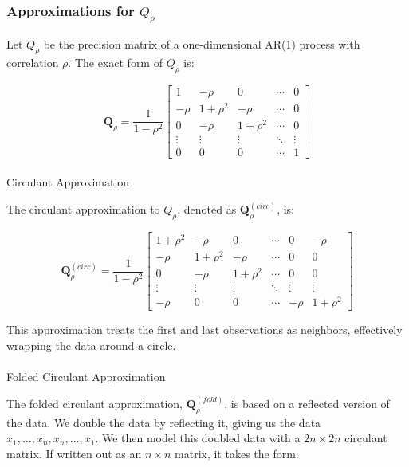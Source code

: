 \documentclass[
  letterpaper,
  DIV=11,
  numbers=noendperiod]{scrartcl}
\makeatletter
\let\oldparagraph\paragraph
\renewcommand{\paragraph}{
    \@ifstar
      \xxxParagraphStar
      \xxxParagraphNoStar
  }
\newcommand{\xxxParagraphStar}[1]{\oldparagraph*{#1}\mbox{}}
\newcommand{\xxxParagraphNoStar}[1]{\oldparagraph{#1}\mbox{}}
\makeatother
\begin{document}
\subsubsection{\texorpdfstring{Approximations for
\(Q_{\rho}\)}{Approximations for Q\_\{\textbackslash rho\}}}\label{approximations-for-q_rho}

Let \(Q_{\rho}\) be the precision matrix of a one-dimensional AR(1)
process with correlation \(\rho\). The exact form of \(Q_{\rho}\) is:

\[
\mathbf{Q}_\rho = \frac{1}{1-\rho^2}
\begin{bmatrix}
1 & -\rho & 0 & \cdots & 0 \\
-\rho & 1+\rho^2 & -\rho & \cdots & 0 \\
0 & -\rho & 1+\rho^2 & \cdots & 0 \\
\vdots & \vdots & \vdots & \ddots & \vdots \\
0 & 0 & 0 & \cdots & 1
\end{bmatrix}
\]

\paragraph{Circulant Approximation}\label{circulant-approximation}

The circulant approximation to \(Q_\rho\), denoted as
\(\mathbf{Q}_\rho^{(circ)}\), is:

\[
\mathbf{Q}_\rho^{(circ)} = \frac{1}{1-\rho^2}
\begin{bmatrix}
1+\rho^2 & -\rho & 0 & \cdots & 0 & -\rho \\
-\rho & 1+\rho^2 & -\rho & \cdots & 0 & 0 \\
0 & -\rho & 1+\rho^2 & \cdots & 0 & 0 \\
\vdots & \vdots & \vdots & \ddots & \vdots & \vdots \\
-\rho & 0 & 0 & \cdots & -\rho & 1+\rho^2
\end{bmatrix}
\]

This approximation treats the first and last observations as neighbors,
effectively wrapping the data around a circle.

\paragraph{Folded Circulant
Approximation}\label{folded-circulant-approximation}

The folded circulant approximation, \(\mathbf{Q}_\rho^{(fold)}\), is
based on a reflected version of the data. We double the data by
reflecting it, giving us the data \(x_1,  \dots, x_n, x_n, \dots, x_1\).
We then model this doubled data with a \(2n \times 2n\) circulant
matrix. If written out as an \(n \times n\) matrix, it takes the form:
\end{document}
